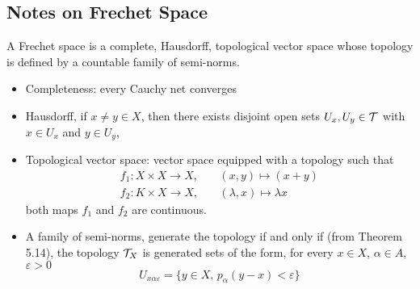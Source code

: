\documentclass[../../main.tex]{subfiles}
\begin{document}
\subsection{Notes on Frechet Space}
A Frechet space is a complete, Hausdorff, topological vector space whose topology is defined by a countable family of semi-norms.
\begin{itemize}
    \item Completeness: every Cauchy net converges
    \item Hausdorff, if $x\neq y\in X$, then there exists disjoint open sets $U_x, U_y\in\mathcal{T}$ with $x\in U_x$ and $y\in U_y$,
    \item Topological vector space: vector space equipped with a topology such that
    \begin{align*}
        f_1:X\times X\to X,&\quad (x,y)\mapsto (x+y)\\
        f_2:K\times X\to X,&\quad (\lambda, x)\mapsto \lambda x
    \end{align*}
    both maps $f_1$ and $f_2$ are continuous.
    \item A family of semi-norms, generate the topology if and only if (from Theorem 5.14), the topology $\mathcal{T}_X$ is generated sets of the form, for every $x\in X$, $\alpha\in A$, $\varepsilon>0$
    \[
    U_{x\alpha\varepsilon}=\biggl\{y\in X,\,p_\alpha(y-x)<\varepsilon\biggr\}
    \]
\end{itemize}
\newpage
\end{document}
